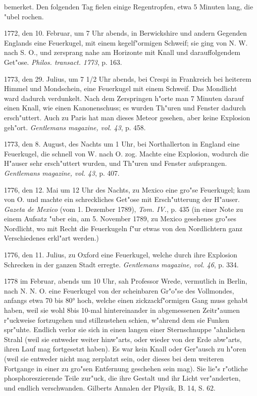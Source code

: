 \documentclass[a4paper, 11pt, oneside, polutonikogreek, german]{article}
\begin{document}
bemerket. Den folgenden Tag fielen einige Regentropfen, etwa 5 Minuten lang, die "ubel rochen.

1772, den 10. Februar, um 7 Uhr abends, in Berwickshire und andern Gegenden Englands eine Feuerkugel, mit einem kegelf"ormigen Schweif; sie ging von N. W. nach S. O., und zersprang nahe am Horizonte mit Knall und darauffolgendem Get"ose. \emph{Philos. transact. 1773}, p. 163.

1773, den 29. Julius, um 7 1/2 Uhr abends, bei Crespi in Frankreich bei heiterem Himmel und Mondschein, eine Feuerkugel mit einem Schweif. Das Mondlicht ward dadurch verdunkelt. Nach dem Zerspringen h"orte man 7 Minuten darauf einen Knall, wie einen Kanonenschuss; es wurden Th"uren und Fenster dadurch ersch"uttert. Auch zu Paris hat man dieses Meteor gesehen, aber keine Explosion geh"ort. \emph{Gentlemans magazine, vol. 43}, p. 458.

1773, den 8. August, des Nachts um 1 Uhr, bei Northallerton in England eine Feuerkugel, die schnell von W. nach O. zog. Machte eine Explosion, wodurch die H"auser sehr ersch"uttert wurden, und Th"uren und Fenster aufsprangen. \emph{Gentlemans magazine, vol. 43}, p. 407.

1776, den 12. Mai um 12 Uhr des Nachts, zu Mexico eine gro"se Feuerkugel; kam von O. und machte ein schreckliches Get"ose mit Ersch"utterung der H"auser. \emph{Gazeta de Mexico} (vom 1. Dezember 1789), \emph{Tom. IV.}, p. 435 (in einer Note zu einem Aufsatz "uber ein, am 5. November 1789, zu Mexico gesehenes gro"ses Nordlicht, wo mit Recht die Feuerkugeln f"ur etwas von den Nordlichtern ganz Verschiedenes erkl"art werden.)

1776, den 11. Julius, zu Oxford eine Feuerkugel, welche durch ihre Explosion Schrecken in der ganzen Stadt erregte. \emph{Gentlemans magazine, vol. 46}, p. 334.

1778 im Februar, abends um 10 Uhr, sah Professor Wrede, vermutlich in Berlin, nach N. N. O. eine Feuerkugel von der scheinbaren Gr"o"se des Vollmondes, anfangs etwa 70 bis 80° hoch, welche einen zickzackf"ormigen Gang muss gehabt haben, weil sie wohl 8bis 10-mal hintereinander in abgemessenen Zeitr"aumen r"uckweise fortzugehen und stillzustehen schien, w"ahrend dem sie Funken spr"uhte. Endlich verlor sie sich in einen langen einer Sternschnuppe "ahnlichen Strahl (weil sie entweder weiter hinw"arts, oder wieder von der Erde abw"arts, ihren Lauf mag fortgesetzt haben). Es war kein Knall oder Ger"ausch zu h"oren (weil sie entweder nicht mag zerplatzt sein, oder dieses bei dem weiteren Fortgange in einer zu gro"sen Entfernung geschehen sein mag). Sie lie"s r"otliche phosphoreszierende Teile zur"uck, die ihre Gestalt und ihr Licht ver"anderten, und endlich verschwanden. Gilberts Annalen der Physik, B. 14, S. 62.
\end{document}
